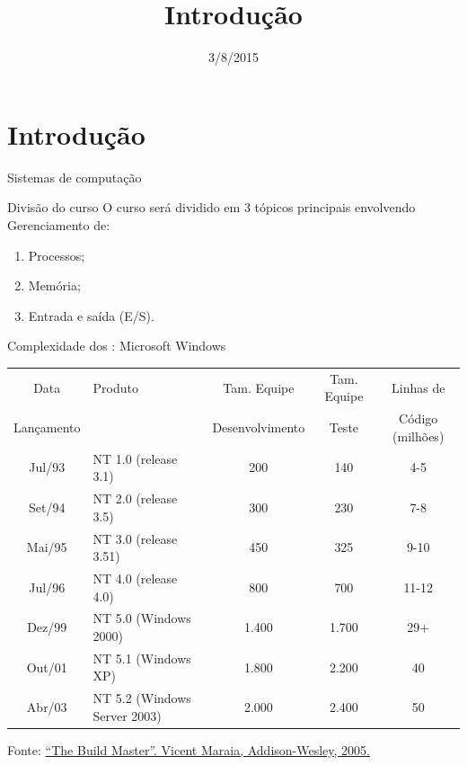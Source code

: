 \date{3/8/2015}
\title{\so\\Introdução}

\frame{\maketitle}

\section{Introdução}

\begin{frame}{Sistemas de computação}



\end{frame}

\begin{frame}{Divisão do curso}
  O curso será dividido em $3$ tópicos principais envolvendo
  Gerenciamento de:
  \begin{enumerate}
  \item Processos;
  \item Memória;
  \item Entrada e saída (E/S).
  \end{enumerate}

\end{frame}


\begin{frame}{Complexidade dos \so{}: Microsoft Windows}
\scriptsize
  \begin{tabular}[f]{|c|l|c|c|c|} \hline
    \tiny  Data  &	 Produto &
     \tiny Tam. Equipe  &	\tiny Tam. Equipe  &
     \tiny Linhas de  \\
     \tiny Lançamento &	  &
     \tiny Desenvolvimento &	 \tiny  Teste &
     \tiny Código  (milhões) \\ \hline\hline
    Jul/93 &	NT 1.0 \tiny (release 3.1) &	200 &	140 &	4-5  \\ \hline
    Set/94 &	NT 2.0 \tiny (release 3.5) &	300 &	230 &	7-8  \\ \hline
    Mai/95 &	NT 3.0 \tiny (release 3.51) &	450 &	325 &	9-10  \\ \hline
    Jul/96 &	NT 4.0 \tiny (release 4.0) &	800 &	700 &	11-12 \\ \hline
    Dez/99 &	NT 5.0 \tiny (Windows 2000) &	1.400 &	1.700 &	29+  \\ \hline
    Out/01 &	NT 5.1 \tiny (Windows XP) &	1.800 &	2.200 &	40  \\ \hline
    Abr/03 &	NT 5.2 \tiny (Windows Server 2003) &	2.000 &	2.400 &	50  \\ \hline
  \end{tabular}
  {\tiny Fonte:
    \href{http://www.amazon.com/exec/obidos/ASIN/0321332059/thinkinginnet-20}{``The
      Build Master''. Vicent Maraia, Addison-Wesley, 2005.} }
\end{frame}

